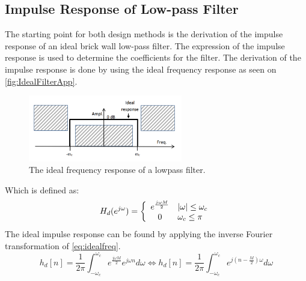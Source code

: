 \subsection*{Impulse Response of Low-pass Filter}
The starting point for both design methods is the derivation of the impulse response of an ideal brick wall low-pass filter. The expression of the impulse response is used to determine the coefficients for the filter. The derivation of the impulse response is done by using the ideal frequency response as seen on \autoref{fig:IdealFilterApp}.
\begin{figure}[H]
\centering
\includegraphics[width=0.6\textwidth]{figures/Ideal_filter.png}
\caption{The ideal frequency response of a lowpass filter.}
\label{fig:IdealFilterApp}
\end{figure}
Which is defined as:
\begin{equation} \label{eq:idealfreq}
H_d(e^{j\omega})=\left\{
\begin{array}{c l}      
    e^{\frac{j\omega M}{2}} & |\omega|\leq\omega_c\\
    0 & \omega_c\leq\pi
\end{array}\right.
\end{equation}
The ideal impulse response can be found by applying the inverse Fourier transformation of \autoref{eq:idealfreq}.
\begin{equation}
h_d[n]=\frac{1}{2\pi}\int_{-\omega_c}^{\omega_c}e^{\frac{j\omega M}{2}} e^{j\omega n} d\omega \Leftrightarrow h_d[n]=\frac{1}{2\pi}\int_{-\omega_c}^{\omega_c}e^{j(n-\frac{M}{2})\omega} d\omega
\end{equation}

